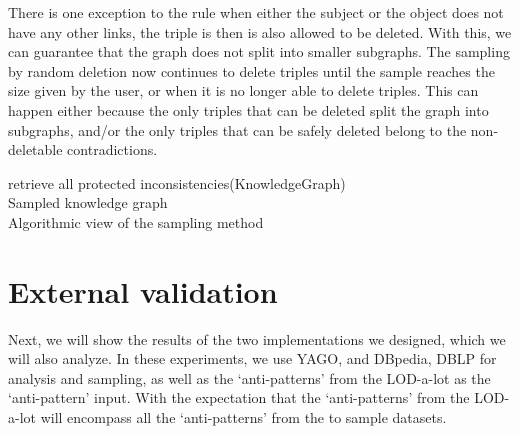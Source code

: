 \documentclass[11pt,letterpaper ,oneside ]{book}
\begin{document}
	There is one exception to the rule when either the subject or the object does not have any other links, the triple is then is also allowed to be deleted. With this, we can guarantee that the graph does not split into smaller subgraphs. 
	The sampling by random deletion now continues to delete triples until the sample reaches the size given by the user, or when it is no longer able to delete triples. This can happen either because the only triples that can be deleted split the graph into subgraphs, and/or the only triples that can be safely deleted belong to the non-deletable contradictions.
	
	\begin{algorithm}
	retrieve all protected inconsistencies(KnowledgeGraph) \\
	\Return Sampled knowledge graph\\
	\caption{Algorithmic view of the sampling method}
	\label{High top view}
\end{algorithm}
	
	\newpage
	\chapter{External validation}\label{externalvalidation}
	Next, we will show the results of the two implementations we designed, which we will also analyze. In these experiments, we use YAGO, and DBpedia, DBLP for analysis and sampling, as well as the `anti-patterns' from the LOD-a-lot as the `anti-pattern' input. With the expectation that the `anti-patterns' from the LOD-a-lot will encompass all the `anti-patterns' from the to sample datasets.\\
			\begin{table}[!b]
		\centering
		\caption{table showing several statistics about graphs.}
		\label{table:GraphStats}
	\end{table}
\end{document}
